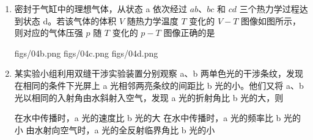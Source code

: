 \documentclass[\gkver]{gaokaozhenti}
\begin{document}
\begin{enumerate}
{$(2\sqrt{2}-1)x_{0}$}
{$2\sqrt{2}x_{0}$}
{$(2\sqrt{2}+1)x_{0}$}


\item
密封于气缸中的理想气体，从状态 a 依次经过 $ab$、$bc$ 和 $cd$ 三个热力学过程达到状态 d。若该气体的体积 $V$ 随热力学温度 $T$ 变化的 $V-T$ 图像如图所示，则对应的气体压强 $p$ 随 $T$ 变化的 $p-T$ 图像正确的是


{figs/04b.png}
{figs/04c.png}
{figs/04d.png}


\item
某实验小组利用双缝干涉实验装置分别观察 a、b 两单色光的干涉条纹，发现在相同的条件下光屏上 a 光相邻两亮条纹的间距比 b 光的小。他们又将 a、b 光以相同的入射角由水斜射入空气，发现 a 光的折射角比 b 光的大，则

{在水中传播时，a 光的速度比 b 光的大}
{在水中传播时，a 光的频率比 b 光的小}
{由水射向空气时，a 光的全反射临界角比 b 光的小}

\end{enumerate}
\end{document}
